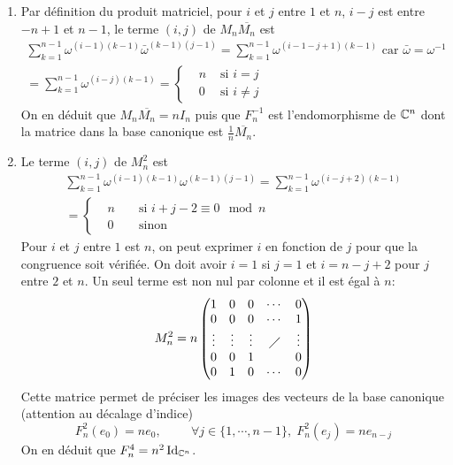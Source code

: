 \begin{enumerate}
\begin{enumerate}
 \item Par définition du produit matriciel, pour $i$ et $j$ entre $1$ et $n$, $i-j$ est entre $-n+1$ et $n-1$, le terme $(i,j)$ de $M_n\overline{M_n}$ est
\begin{multline*}
 \sum_{k=1}^{n-1}\omega^{(i-1)(k-1)}\bar\omega^{(k-1)(j-1)}
= \sum_{k=1}^{n-1}\omega^{(i-1-j+1)(k-1)}\text{ car } \bar\omega = \omega^{-1}\\
= \sum_{k=1}^{n-1}\omega^{(i-j)(k-1)}
= \left\lbrace
\begin{aligned}
 &n &\text{ si } i=j\\
 &0 &\text{ si } i\neq j
\end{aligned}
\right. 
\end{multline*}
On en déduit que $M_n \overline{M_n}=nI_n$ puis que $F_n^{-1}$ est l'endomorphisme de $\mathbb{C}^n$ dont la matrice dans la base canonique est  $\frac{1}{n}\overline{M_n}$.
 \item Le terme $(i,j)$ de $M_n^2$ est
\begin{multline*}
 \sum_{k=1}^{n-1}\omega^{(i-1)(k-1)}\omega^{(k-1)(j-1)}
= \sum_{k=1}^{n-1}\omega^{(i-j+2)(k-1)}\\
= \left\lbrace
\begin{aligned}
 &n & &\text{ si } i+j-2 \equiv 0 \mod n\\
 &0 & &\text{ sinon }
\end{aligned}
\right. 
\end{multline*}
Pour $i$ et $j$ entre $1$ est $n$, on peut exprimer $i$ en fonction de $j$ pour que la congruence soit vérifiée. On doit avoir $i=1$ si $j=1$ et $i=n-j+2$ pour $j$ entre $2$ et $n$. Un seul terme est non nul par colonne et il est égal à $n$:
\begin{displaymath}
 M_n^2= n
\begin{pmatrix}
 1      & 0      & 0      & \cdots  & 0      \\
 0      & 0      & 0      & \cdots  & 1      \\
 \vdots & \vdots & \vdots & \diagup & \vdots \\
 0      & 0      & 1      &         & 0      \\
 0      & 1      & 0      & \cdots  & 0
\end{pmatrix}
\end{displaymath}
Cette matrice permet de préciser les images des vecteurs de la base canonique (attention au décalage d'indice)
\begin{displaymath}
 F_n^2(e_0)=n e_0,\hspace{1cm}\forall j\in\{1,\cdots,n-1\},\; F_n^2(e_j)=ne_{n-j}
\end{displaymath}
On en déduit que $F_n^4 = n^2 \operatorname{Id}_{\mathbb{C}^n}$.
\end{enumerate}


\end{enumerate}
